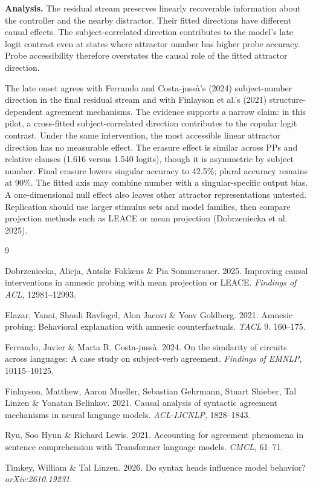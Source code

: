 \documentclass[12pt]{article}
\begin{document}
\textbf{Analysis.}
The residual stream preserves linearly recoverable information about the
controller and the nearby distractor. Their fitted directions have different
causal effects. The subject-correlated direction contributes to the
model's late logit contrast even at states where attractor number has higher
probe accuracy. Probe accessibility therefore overstates the causal role of
the fitted attractor direction.

The late onset agrees with Ferrando and Costa-juss\`a's (2024) subject-number
direction in the final residual stream and with Finlayson et al.'s (2021)
structure-dependent agreement mechanisms. The evidence supports a narrow
claim: in this pilot, a cross-fitted subject-correlated direction contributes
to the copular logit contrast. Under the same intervention, the most accessible
linear attractor direction has no measurable effect. The erasure effect is
similar across PPs and relative clauses (1.616 versus 1.540 logits), though it
is asymmetric by subject number. Final erasure lowers singular accuracy to
42.5\%; plural accuracy remains at 90\%. The fitted axis may combine number with
a singular-specific output bias. A one-dimensional null effect also leaves
other attractor representations untested. Replication should use larger
stimulus sets and model families, then compare projection methods such as LEACE
or mean projection (Dobrzeniecka et al. 2025).

\vspace{-0.35em}
\begin{thebibliography}{9}
\setlength{\itemsep}{0pt}
\setlength{\parskip}{0pt}

Dobrzeniecka, Alicja, Antske Fokkens \& Pia Sommerauer. 2025.
Improving causal interventions in amnesic probing with mean projection or LEACE.
\textit{Findings of ACL}, 12981--12993.

Elazar, Yanai, Shauli Ravfogel, Alon Jacovi \& Yoav Goldberg. 2021.
Amnesic probing: Behavioral explanation with amnesic counterfactuals.
\textit{TACL} 9. 160--175.

Ferrando, Javier \& Marta R. Costa-juss\`a. 2024.
On the similarity of circuits across languages: A case study on subject-verb agreement.
\textit{Findings of EMNLP}, 10115--10125.

Finlayson, Matthew, Aaron Mueller, Sebastian Gehrmann, Stuart Shieber,
Tal Linzen \& Yonatan Belinkov. 2021.
Causal analysis of syntactic agreement mechanisms in neural language models.
\textit{ACL-IJCNLP}, 1828--1843.

Ryu, Soo Hyun \& Richard Lewis. 2021.
Accounting for agreement phenomena in sentence comprehension with Transformer
language models. \textit{CMCL}, 61--71.

Timkey, William \& Tal Linzen. 2026.
Do syntax heads influence model behavior?
\textit{arXiv:2610.19231}.

\end{thebibliography}
\end{document}
